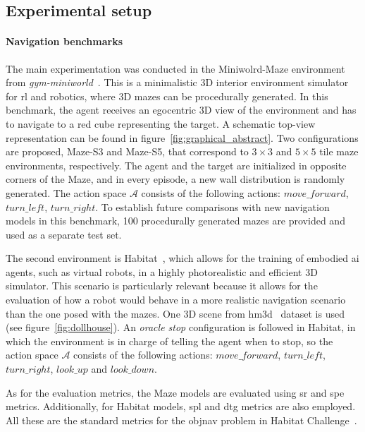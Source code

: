 \subsection{Experimental setup}\label{subsec:experimental-setup}

\paragraph*{Navigation benchmarks}

The main experimentation was conducted in the Miniwolrd-Maze environment from \textit{gym-miniworld}~\cite{gym_miniworld}.
This is a minimalistic 3D interior environment simulator for \acrshort{rl} and robotics, where 3D mazes can be procedurally generated.
In this benchmark, the agent receives an egocentric 3D view of the environment and has to navigate to a red cube representing the target.
A schematic top-view representation can be found in figure~\ref{fig:graphical_abstract}.
Two configurations are proposed, Maze-S3 and Maze-S5, that correspond to $3\times3$ and $5\times5$ tile maze environments, respectively.
The agent and the target are initialized in opposite corners of the Maze, and in every episode, a new wall distribution is randomly generated.
The action space $\mathcal{A}$ consists of the following actions: $move\_forward$, $turn\_left$, $turn\_right$.
To establish future comparisons with new navigation models in this benchmark, 100 procedurally generated mazes are provided and used as a separate test set.


The second environment is Habitat~\cite{szot2021}, which allows for the training of embodied \acrshort{ai} agents, such as virtual robots, in a highly photorealistic and efficient 3D simulator.
This scenario is particularly relevant because it allows for the evaluation of how a robot would behave in a more realistic navigation scenario than the one posed with the mazes.
One 3D scene from \acrshort{hm3d}~\cite{ramakrishnan2021} dataset is used (see figure~\ref{fig:dollhouse}).
An \textit{oracle stop} configuration is followed in Habitat, in which the environment is in charge of telling the agent when to stop, so the action space $\mathcal{A}$ consists of the following actions: $move\_forward$, $turn\_left$, $turn\_right$, $look\_up$ and $look\_down$.

As for the evaluation metrics, the Maze models are evaluated using \acrfull{sr} and \acrfull{spe} metrics.
Additionally, for Habitat models, \acrfull{spl} and \acrfull{dtg} metrics are also employed.
All these are the standard metrics for the \acrshort{objnav} problem in Habitat Challenge~\cite{batra2020}.

